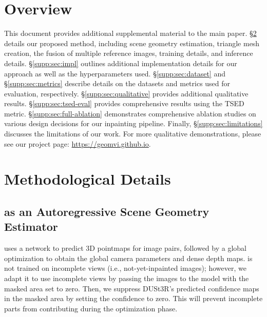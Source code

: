 \setcounter{section}{0}
\renewcommand{\thesection}{\Alph{section}}
\renewcommand{\theHsection}{\Alph{section}}
\maketitlesupplementaryarxiv

\section{Overview}

This document provides additional supplemental material to the main paper.
\S\ref{supp:sec:method} details our proposed method, including scene geometry estimation, triangle mesh creation, the fusion of multiple reference images, training details, and inference details.
\S\ref{supp:sec:impl} outlines additional implementation details for our approach as well as the hyperparameters used. \S\ref{supp:sec:dataset} and \S\ref{supp:sec:metrics} describe details on the datasets and metrics used for evaluation, respectively.
\S\ref{supp:sec:qualitative} provides additional qualitative results.
\S\ref{supp:sec:tsed-eval} provides comprehensive results using the TSED metric.
\S\ref{supp:sec:full-ablation} demonstrates comprehensive ablation studies on various design decisions for our inpainting pipeline.
Finally, \S\ref{supp:sec:limitations} discusses the limitations of our work.
For more qualitative demonstrations,
please see our project page: \href{https://geomvi.github.io/}{https://geomvi.github.io}.

\section{Methodological Details}
\label{supp:sec:method}

\subsection{\duster as an Autoregressive Scene Geometry Estimator}
\label{supp:subsec:dust3r}

\duster \cite{dust3r} uses a network to predict 3D pointmaps for image pairs, followed by a global optimization to obtain the global camera parameters and dense depth maps. \duster is not trained on incomplete views (i.e., not-yet-inpainted images); however, we adapt it to use incomplete views by passing the images to the model with the masked area set to zero. Then, we suppress DUSt3R's predicted confidence maps in the masked area by setting the confidence to zero. This will prevent incomplete parts from contributing during the optimization phase.

